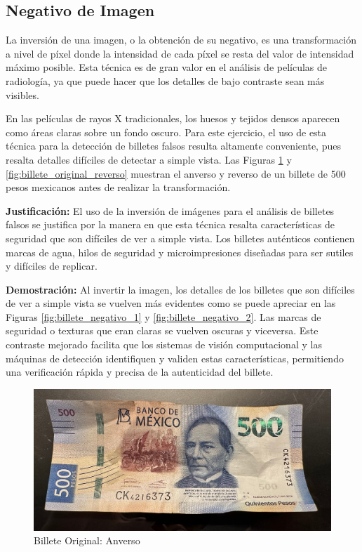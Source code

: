 \documentclass[12pt,letterpaper]{article}
\begin{document}
\subsection{Negativo de Imagen}

La inversión de una imagen, o la obtención de su negativo, es una transformación a nivel de píxel donde la intensidad de cada píxel se resta del valor de intensidad máximo posible. Esta técnica es de gran valor en el análisis de películas de radiología, ya que puede hacer que los detalles de bajo contraste sean más visibles.

En las películas de rayos X tradicionales, los huesos y tejidos densos aparecen como áreas claras sobre un fondo oscuro. Para este ejercicio, el uso de esta técnica para la detección de billetes falsos resulta altamente conveniente, pues resalta detalles difíciles de detectar a simple vista. Las Figuras \ref{fig:billete_original_anverso} y \ref{fig:billete_original_reverso} muestran el anverso y reverso de un billete de 500 pesos mexicanos antes de realizar la transformación.

\textbf{Justificación:} El uso de la inversión de imágenes para el análisis de billetes falsos se justifica por la manera en que esta técnica resalta características de seguridad que son difíciles de ver a simple vista. Los billetes auténticos contienen marcas de agua, hilos de seguridad y microimpresiones diseñadas para ser sutiles y difíciles de replicar.

\textbf{Demostración:} Al invertir la imagen, los detalles de los billetes que son difíciles de ver a simple vista se vuelven más evidentes como se puede apreciar en las Figuras \ref{fig:billete_negativo_1} y \ref{fig:billete_negativo_2}. Las marcas de seguridad o texturas que eran claras se vuelven oscuras y viceversa.
Este contraste mejorado facilita que los sistemas de visión computacional y las máquinas de detección identifiquen y validen estas características, permitiendo una verificación rápida y precisa de la autenticidad del billete.

\begin{figure}[H]
  \centering
  \includegraphics[width=0.5\linewidth]{../data/billete-original/img2.jpg}
  \caption{Billete Original: Anverso}
  \label{fig:billete_original_anverso}
\end{figure}
\end{document}
